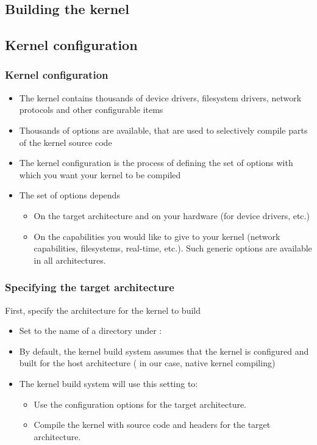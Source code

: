 \subsection{Building the kernel}

\subsection{Kernel configuration}

\begin{frame}
  \frametitle{Kernel configuration}
  \begin{itemize}
  \item The kernel contains thousands of device drivers, filesystem
    drivers, network protocols and other configurable items
  \item Thousands of options are available, that are used to
    selectively compile parts of the kernel source code
  \item The kernel configuration is the process of defining the set of
    options with which you want your kernel to be compiled
  \item The set of options depends
    \begin{itemize}
    \item On the target architecture and on your hardware (for device drivers, etc.)
    \item On the capabilities you would like to give to your kernel
      (network capabilities, filesystems, real-time, etc.).
      Such generic options are available in all architectures.
    \end{itemize}
  \end{itemize}
\end{frame}

\begin{frame}
  \frametitle{Specifying the target architecture}
  First, specify the architecture for the kernel to build
  \begin{itemize}
  \item Set  to the name of a directory under :\\
  \item By default, the kernel build system assumes that the
        kernel is configured and built for the host architecture
	( in our case, native kernel compiling)
  \item The kernel build system will use this setting to:
	\begin{itemize}
	\item Use the configuration options for the target
	      architecture.
	\item Compile the kernel with source code and headers
	      for the target architecture.
	\end{itemize}
  \end{itemize}
\end{frame}

